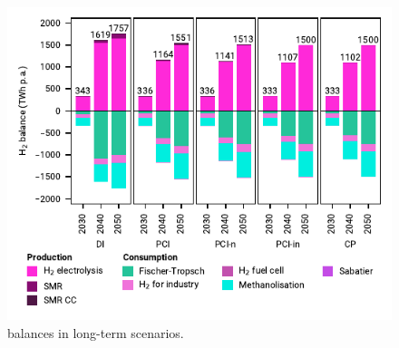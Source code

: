 \documentclass[preprint,12pt,sort&compress]{elsarticle}
\begin{document}
\begin{figure}[t]
  \centering
  \includegraphics{balances_overview_H2}
  \caption{ balances in long-term scenarios.}
  \label{fig:balances_overview_H2}
\end{figure}
\end{document}
